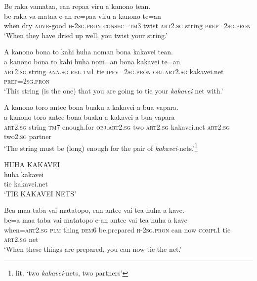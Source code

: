 \ea\label{ex:text22-47}
Be raka vamataa, ean repaa viru a kanono tean.\\
\gll be	raka	va-mataa	e-an	re=paa	viru	a	kanono	te=an\\
     when	dry	\textsc{advr}-good	\textsc{h}-2\textsc{sg}.\textsc{pron}	\textsc{consec}=\textsc{tm}3	twist	\textsc{art}2.\textsc{sg}	string	\textsc{prep}=2\textsc{sg}.\textsc{pron}\\
\glt `When they have dried up well, you twist your string.'
\z

\ea\label{ex:text22-48}
A kanono bona to kahi huha noman bona kakavei tean.\\
\gll a	kanono	bona	to	kahi	huha	nom=an	bona	kakavei	te=an\\
     \textsc{art}2.\textsc{sg}	string	\textsc{ana}.\textsc{sg}	\textsc{rel}	\textsc{tm}1	tie	\textsc{ipfv}=2\textsc{sg}.\textsc{pron}	\textsc{obj}.\textsc{art}2.\textsc{sg}	kakavei.net	\textsc{prep}=2\textsc{sg}.\textsc{pron}\\
\glt `This string (is the one) that you are going to tie your \textit{kakavei} net with.'
\z

\ea\label{ex:text22-49}
A kanono toro antee bona buaku a kakavei a bua vapara.\\
\gll a	kanono	toro	antee	bona	buaku	a	kakavei	a	bua	vapara\\
     \textsc{art}2.\textsc{sg}	string	\textsc{tm}7	enough.for	\textsc{obj}.\textsc{art}2.\textsc{sg}	two	\textsc{art}2.\textsc{sg}	kakavei.net	\textsc{art}2.\textsc{sg}	two2.\textsc{sg}	partner\\
\glt `The string must be (long) enough for the pair of \textit{kakavei}-nets.'\footnote{lit. `two \textit{kakavei}-nets, two partners'}
\z

\ea\label{ex:text22-50}
HUHA KAKAVEI\\
\gll huha	kakavei\\
     tie	kakavei.net\\
\glt `TIE KAKAVEI NETS'
\z

\ea\label{ex:text22-51}
Bea maa taba vai matatopo, ean antee vai tea huha a kave.\\
\gll be=a	maa	taba	vai	matatopo	e-an	antee	vai	tea	huha	a	kave\\
     when=\textsc{art}2.\textsc{sg}	\textsc{plm}	thing	\textsc{dem}6	be.prepared	\textsc{h}-2\textsc{sg}.\textsc{pron}	can	now	\textsc{compl}1	tie	\textsc{art}2.\textsc{sg}	net\\
\glt `When these things are prepared, you can now tie the net.'
\z


